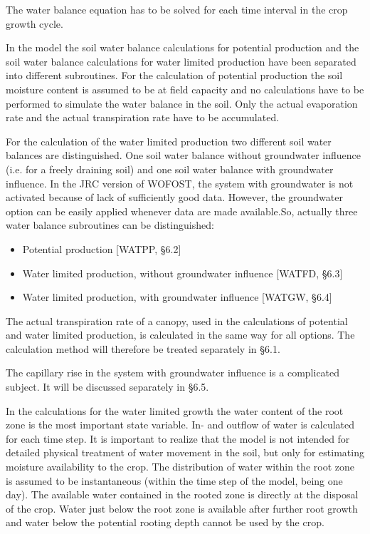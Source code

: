 The water balance equation has to be solved for each time interval in the crop growth cycle.

In the model the soil water balance calculations for potential production and the soil water
balance calculations for water limited production have been separated into different
subroutines. For the calculation of potential production the soil moisture content is
assumed to be at field capacity and no calculations have to be performed to simulate the
water balance in the soil. Only the actual evaporation rate and the actual transpiration rate
have to be accumulated. 

For the calculation of the water limited production two different soil water balances are
distinguished. One soil water balance without groundwater influence (i.e. for a freely
draining soil) and one soil water balance with groundwater influence. In the JRC version
of WOFOST, the system with groundwater is not activated because of lack of sufficiently
good data. However, the groundwater option can be easily applied whenever data are
made available.So, actually three water balance subroutines can be distinguished:
\begin{itemize}
\item Potential production [WATPP, \S  6.2]\\
\item Water limited production, without groundwater influence [WATFD, \S  6.3]\\
\item Water limited production, with groundwater influence [WATGW, \S  6.4]
\end{itemize}

The actual transpiration rate of a canopy, used in the calculations of potential and water
limited production, is calculated in the same way for all options. The calculation method
will therefore be treated separately in \S 6.1. 

The capillary rise in the system with groundwater influence is a complicated subject. It
will be discussed separately in \S 6.5.

In the calculations for the water limited growth the water content of the root zone is the
most important state variable. In- and outflow of water is calculated for each time step. It
is important to realize that the model is not intended for detailed physical treatment of
water movement in the soil, but only for estimating moisture availability to the crop. The
distribution of water within the root zone is assumed to be instan\-taneous (within the time
step of the model, being one day). The available water contained in the rooted zone is
directly at the disposal of the crop. Water just below the root zone is available after
further root growth and water below the potential rooting depth cannot be used by the
crop.


